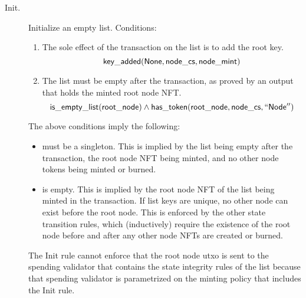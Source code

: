\documentclass[../midgard.tex]{subfiles}
\begin{document}
\newcommand{\initSpendingValidatorWarning}[0]{
    \begin{warningblock}
        Offchain code for the list-initialization transaction MUST send the root node to the list's spending validator.
        Otherwise, the linked list can be corrupted.
    \end{warningblock}
}

\begin{description}
    \item[Init.] Initialize an empty list.
      Conditions:
        \begin{enumerate}
            \item The sole effect of the transaction on the list is to add the root key.
                \begin{equation*}
                    \mathsf{key\_added}(\mathsf{None}, \mathsf{node\_cs}, \mathsf{node\_mint})
                \end{equation*}
            
            \item The list must be empty after the transaction, as proved by an output  that holds the minted root node NFT.
                \begin{equation*}
                    \mathsf{is\_empty\_list}(\mathsf{root\_node})  \land
                    \mathsf{has\_token}(\mathsf{root\_node}, \mathsf{node\_cs}, \mathsf{``Node''})
                \end{equation*}
        \end{enumerate}
        The above conditions imply the following:
        \begin{itemize}
            \item {} must be a singleton.
              This is implied by the list being empty after the transaction, the root node NFT being minted, and no other node tokens being minted or burned.
            \item {} is empty.
              This is implied by the root node NFT of the list being minted in the transaction.
              If list keys are unique, no other node can exist before the root node.
              This is enforced by the other state transition rules, which (inductively) require the existence of the root node before and after any other node NFTs are created or burned.
        \end{itemize}
        
        The Init rule cannot enforce that the root node utxo is sent to the spending validator that contains the state integrity rules of the list because that spending validator is parametrized on the minting policy that includes the Init rule.
        

\end{description}
\end{document}

